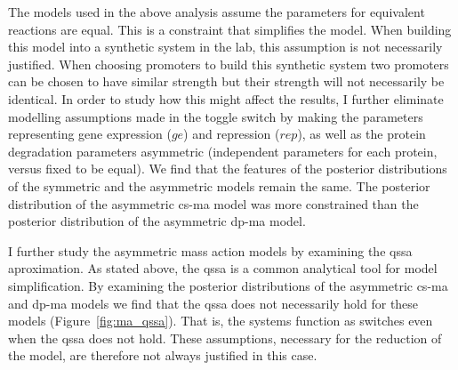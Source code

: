 The models used in the above analysis assume the parameters for equivalent reactions are equal. This is a constraint that simplifies the model. When building this model into a synthetic system in the lab, this assumption is not necessarily justified. When choosing promoters to build this synthetic system two promoters can be chosen to have similar strength but their strength will not necessarily be identical.  In order to study how this might affect the results, I further eliminate modelling assumptions made in the toggle switch by making the parameters representing gene expression ($ge$) and repression ($rep$), as well as the protein degradation parameters asymmetric (independent parameters for each protein, versus fixed to be equal). We find that the features of the posterior distributions of the symmetric and the asymmetric models remain the same. The posterior distribution of the asymmetric \acrshort{cs-ma} model was more constrained than the posterior distribution of the asymmetric \acrshort{dp-ma} model. 

I further study the asymmetric mass action models by examining the \acrshort{qssa} aproximation. As stated above, the \acrshort{qssa} is a common analytical tool for model simplification. By examining the posterior distributions of the asymmetric \acrshort{cs-ma} and \acrshort{dp-ma} models we find that the \acrshort{qssa} does not necessarily hold for these models (Figure~\ref{fig:ma_qssa}). That is, the systems function as switches even when the \acrshort{qssa} does not hold. These assumptions, necessary for the reduction of the model, are therefore not always justified in this case. 

